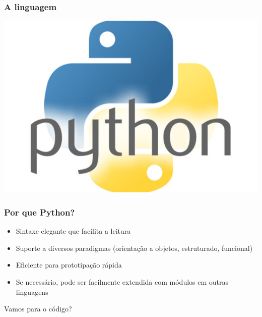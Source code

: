 \documentclass[aspectratio=169,14pt]{beamer}
\begin{document}
\begin{frame}
    \frametitle{A linguagem}
    \begin{center}
        \includegraphics[height=0.5\paperheight]{../../images/pythonlogo.jpg}
    \end{center}
\end{frame}

\begin{frame}
    \frametitle{Por que Python?}
    \vfill
    \begin{itemize}
        \item Sintaxe elegante que facilita a leitura
        \item Suporte a diversos paradigmas (orientação a objetos,
        estruturado, funcional)
        \item Eficiente para prototipação rápida
        \item Se necessário, pode ser facilmente extendida com módulos
        em outras linguagens
    \end{itemize}
\end{frame}

\begin{frame}
    \vfill
    \begin{center}
        \huge Vamos para o código?
    \end{center}
\end{frame}
\end{document}
